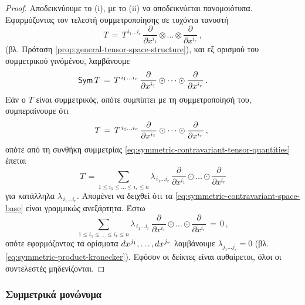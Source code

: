 \documentclass[11pt,a4paper,twoside,openright]{book}
\begin{document}
\begin{proof}
Αποδεικνύουμε το (i), με το (ii) να αποδεικνύεται πανομοιότυπα.
Εφαρμόζοντας τον τελεστή συμμετροποίησης σε τυχόντα τανυστή
\begin{equation*}
T \,=\, T^{\,i_1 \dots i_r} \, \frac{\partial}{\partial x^{i_1}} \otimes \dots \otimes \frac{\partial}{\partial x^{i_r}}\,,
\end{equation*}
(βλ. Πρόταση \ref{prop:general-tensor-space-structure}),
και εξ ορισμού του συμμετρικού γινόμένου, λαμβάνουμε
\begin{equation*}
\hspace{-24pt}\textup{\textsf{Sym}}\,T \,=\, T^{\,i_1 \dots i_r} \, \frac{\partial}{\partial x^{i_1}} \odot \dots \odot \frac{\partial}{\partial x^{i_r}}\,.
\end{equation*}
Εάν ο $Τ$ είναι συμμετρικός, οπότε συμπίπτει με τη συμμετροποίησή του, συμπεραίνουμε ότι
\begin{equation*}
\hspace{-4pt}T \,=\, T^{\,i_1 \dots i_r} \, \frac{\partial}{\partial x^{i_1}} \odot \dots \odot \frac{\partial}{\partial x^{i_r}}\,,
\end{equation*}
οπότε από τη συνθήκη συμμετρίας \eqref{eq:symmetric-contravariant-tensor-quantities} έπεται
\begin{equation}\label{eq:tensor-symmetric-expansion-intermediate}
T
\,=
\sum_{1 \le i_1 \le \dots \le i_r \le n}
\lambda_{\,i_1 \dots i_r}
\,
\frac{\partial}{\partial x^{i_1}} \odot \dots \odot \frac{\partial}{\partial x^{i_r}}
\end{equation}
για κατάλληλα $\lambda_{\,i_1 \dots i_r}$.
Απομένει να δειχθεί ότι τα
\eqref{eq:symmetric-contravariant-space-base}
είναι γραμμικώς ανεξάρτητα. Έστω
\begin{equation*}
\sum_{1 \le i_1 \le \dots \le i_r \le n}
\lambda_{\,i_1 \dots i_r}
\,
\frac{\partial}{\partial x^{i_1}} \odot \dots \odot \frac{\partial}{\partial x^{i_r}}
\,=\,
0\,,
\end{equation*}
οπότε εφαρμόζοντας τα ορίσματα
$
dx^{\hspace{.5pt}j_1}, \dots, dx^{\hspace{.5pt}j_r}
$
λαμβάνουμε $\lambda_{j_1 \dots j_r} = 0$
(βλ. \eqref{eq:symmetric-product-kronecker}).
Eφόσον οι δείκτες είναι αυθαίρετοι, όλοι οι συντελεστές μηδενίζονται.
\end{proof}

\subsubsection{Συμμετρικά μονώνυμα}
	\label{sec:symmetric-mononyms}
\end{document}
